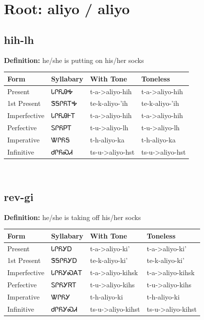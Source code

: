 \documentclass{article}%
\begin{document}
%
\normalsize%
\section*{Root: aliyo / aliyo}%
\subsection*{hih-lh}%
\textbf{Definition: }%
he/she is putting on his/her socks%
\\[0.5em]%
\begin{tabular}{|l|l|l|l|}%
\hline%
\textbf{Form}&\textbf{Syllabary}&\textbf{With Tone}&\textbf{Toneless}\\%
\hline%
Present&ᏓᎵᏲᎯᎭ&t{-}a{-}>aliyo{-}hih&t{-}a{-}>aliyo{-}hih\\%
1st Present&ᏕᎦᎵᏲᎢᎭ&te{-}k{-}aliyo{-}'ih&te{-}k{-}aliyo{-}'ih\\%
Imperfective&ᏓᎵᏲᎯᎰᎢ&t{-}a{-}>aliyo{-}hih&t{-}a{-}>aliyo{-}hih\\%
Perfective&ᏚᎵᏲᏢᎢ&t{-}u{-}>aliyo{-}lh&t{-}u{-}>aliyo{-}lh\\%
Imperative&ᏔᎵᏲᎦ&t{-}h{-}aliyo{-}ka&t{-}h{-}aliyo{-}ka\\%
Infinitive&ᏧᎵᏲᏍᏗ&ts{-}u{-}>aliyo{-}hst&ts{-}u{-}>aliyo{-}hst\\%
\hline%
\end{tabular}%
\\[1em]%
\subsection*{rev-gi}%
\textbf{Definition: }%
he/she is taking off his/her socks%
\\[0.5em]%
\begin{tabular}{|l|l|l|l|}%
\hline%
\textbf{Form}&\textbf{Syllabary}&\textbf{With Tone}&\textbf{Toneless}\\%
\hline%
Present&ᏓᎵᏲᎩᎠ&t{-}a{-}>aliyo{-}ki'&t{-}a{-}>aliyo{-}ki'\\%
1st Present&ᏕᎦᎵᏲᎩᎠ&te{-}k{-}aliyo{-}ki'&te{-}k{-}aliyo{-}ki'\\%
Imperfective&ᏓᎵᏲᎩᏍᎪᎢ&t{-}a{-}>aliyo{-}kihsk&t{-}a{-}>aliyo{-}kihsk\\%
Perfective&ᏚᎵᏲᎩᏒᎢ&t{-}u{-}>aliyo{-}kihs&t{-}u{-}>aliyo{-}kihs\\%
Imperative&ᏔᎵᏲᎩ&t{-}h{-}aliyo{-}ki&t{-}h{-}aliyo{-}ki\\%
Infinitive&ᏧᎵᏲᎩᏍᏗ&ts{-}u{-}>aliyo{-}kihst&ts{-}u{-}>aliyo{-}kihst\\%
\hline%
\end{tabular}%
\\[1em]%
\end{document}
